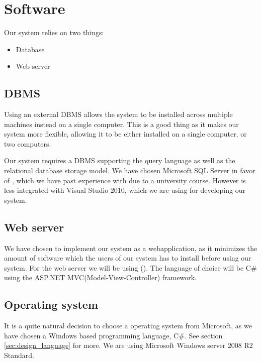 \section{Software}
\label{sec:software}

Our system relies on two things:

\begin{itemize}
	\item Database
	\item Web server
\end{itemize}

\subsection{DBMS}
\label{subsec:dbms}

Using an external DBMS allows the system to be installed across multiple machines instead on a single computer. This is a good thing as it makes our system more flexible, allowing it to be either installed on a single computer, or two computers.

Our system requires a DBMS supporting the query language \sql[] as well as the relational database storage model.
We have chosen Microsoft SQL Server in favor of \posgresql[], which we have past experience with due to a university course. However \posgresql[] is less integrated with Visual Studio 2010, which we are using for developing our system. 

\subsection{Web server}
\label{subsec:webserver}


We have chosen to implement our system as a webapplication, as it minimizes the amount of software which the users of our system has to install before using our system. 
For the web server we will be using  \wholeiis[] (\iis[]). 
The language of choice will be C\# using the ASP.NET MVC(Model-View-Controller) framework. \\


\subsection{Operating system}
\label{subsec:operating_system}

It is a quite natural decision to choose a operating system from Microsoft, as we have chosen a Windows based programming language, C\#. See section \ref{sec:design_language} for more.
We are using Microsoft Windows server 2008 R2 Standard. 